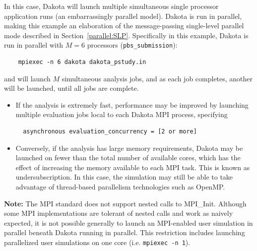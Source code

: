 In this case, Dakota will launch multiple simultaneous single
processor application runs (an embarrassingly parallel model).  
Dakota is run in parallel, making
this example an elaboration of the message-passing single-level
parallel mode described in Section~\ref{parallel:SLP}.  Specifically
in this example, Dakota is run in parallel with $M=6$ processors
({\tt pbs\_submission}):
\begin{verbatim}
    mpiexec -n 6 dakota dakota_pstudy.in
\end{verbatim}
and will launch $M$ simultaneous analysis jobs, and as each job 
completes, another will be launched, until all jobs are complete.
\begin{itemize}


\item If the analysis is extremely fast, performance may be
improved by launching multiple evaluation jobs local to each Dakota
MPI process, specifying
\begin{verbatim}
  asynchronous evaluation_concurrency = [2 or more]
\end{verbatim}

\item Conversely, if the analysis has large memory requirements, 
Dakota may be launched on fewer than the total number of available cores, 
which has the effect of increasing the memory available to each MPI task. 
This is known as undersubscription. In this case, the simulation may still 
be able to take advantage of thread-based parallelism technologies such as OpenMP.

\end{itemize}

{\bf Note:} The MPI standard does not support nested calls to MPI\_Init.
Although some MPI implementations are tolerant of nested calls and work as 
naively expected, it is not possible generally to launch an MPI-enabled user 
simulation in parallel beneath Dakota running in parallel. This restriction 
includes launching parallelized user simulations on one core (i.e. {\tt  mpiexec -n 1}).

